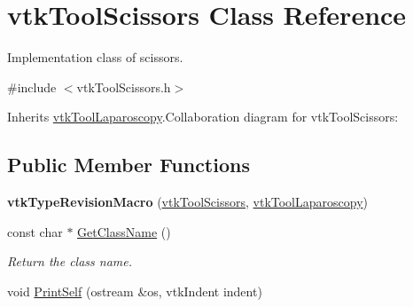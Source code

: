 \hypertarget{classvtkToolScissors}{
\section{vtkToolScissors Class Reference}
\label{classvtkToolScissors}
}


Implementation class of scissors.  


{\ttfamily \#include $<$vtkToolScissors.h$>$}

Inherits \hyperlink{classvtkToolLaparoscopy}{vtkToolLaparoscopy}.Collaboration diagram for vtkToolScissors:\subsection*{Public Member Functions}
\begin{DoxyCompactItemize}
\item 
\hypertarget{classvtkToolScissors_a0dfdaf5d716eb50265221bbdef3f702d}{
{\bfseries vtkTypeRevisionMacro} (\hyperlink{classvtkToolScissors}{vtkToolScissors}, \hyperlink{classvtkToolLaparoscopy}{vtkToolLaparoscopy})}
\label{classvtkToolScissors_a0dfdaf5d716eb50265221bbdef3f702d}

\item 
\hypertarget{classvtkToolScissors_a7770d9aeef652f55e1f8a4bd5bbc48f5}{
const char $\ast$ \hyperlink{classvtkToolScissors_a7770d9aeef652f55e1f8a4bd5bbc48f5}{GetClassName} ()}
\label{classvtkToolScissors_a7770d9aeef652f55e1f8a4bd5bbc48f5}

\begin{DoxyCompactList}\small\item\em Return the class name. \item\end{DoxyCompactList}\item 
\hypertarget{classvtkToolScissors_a608e73bf625ddcc27389612e00b81980}{
void \hyperlink{classvtkToolScissors_a608e73bf625ddcc27389612e00b81980}{PrintSelf} (ostream \&os, vtkIndent indent)}
\label{classvtkToolScissors_a608e73bf625ddcc27389612e00b81980}


\end{DoxyCompactItemize}
